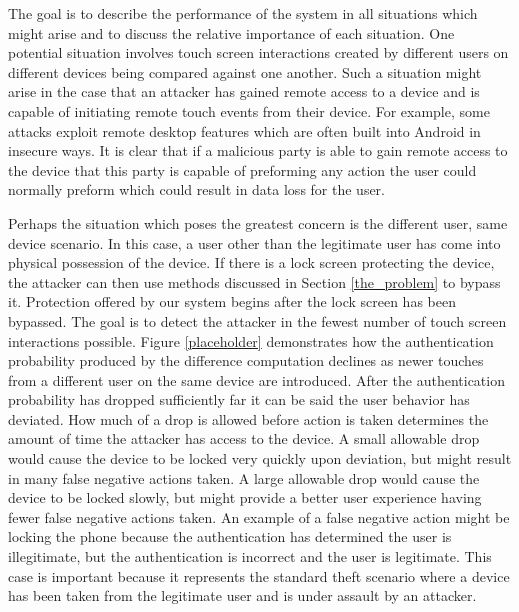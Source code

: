 
%
The goal is to describe the performance of the system
in all situations which might arise and
to discuss the relative importance
of each situation.
%
One potential situation involves
touch screen interactions created by 
different users on different devices
being compared against one another.
%
Such a situation might arise in the case
that an attacker has gained remote access to 
a device and is capable of initiating remote touch events
from their device.
%
For example,
some attacks exploit
remote desktop features which 
are often built into Android in insecure ways. %
%
It is clear that if a malicious party
is able to gain remote access to the device
that this party is capable of 
preforming any action the user could normally preform
which could result in data loss for the user.
%

Perhaps the situation which poses the greatest concern 
is the different user, same device scenario.
In this case,
a user other than the legitimate user
has come into physical possession of the
device.
%
If there is a lock screen protecting the device,
the attacker can then use methods discussed 
in Section \ref{the_problem} to bypass it.
Protection offered by our system begins 
after the lock screen
has been bypassed.
%
The goal is to detect the attacker in the fewest
number of touch screen interactions possible.
%
Figure \ref{placeholder} %
demonstrates how the
authentication probability produced by the difference computation
declines as newer touches from a different user on the same device are introduced.
%
After the authentication probability has dropped sufficiently far
it can be said the user behavior has deviated.
How much of a drop is allowed before action is taken
determines the amount of time the attacker has access to the device.
%
A small allowable drop
would cause the device to be locked very quickly upon deviation,
but might result in many false negative actions taken.
A large allowable drop
would cause the device to be locked slowly, but
might provide a better user experience having fewer 
false negative actions taken.
%
An example of a false negative action might be locking the 
phone because the authentication has determined the user is
illegitimate, but the authentication is incorrect and the user is legitimate.
%
This case is important because it represents the standard theft scenario
where a device has been taken from the legitimate user
and is under assault by an attacker.
%


